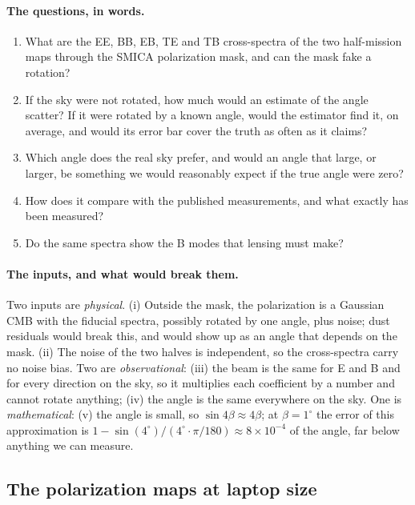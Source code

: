 \paragraph{The questions, in words.}
\begin{enumerate}[label=(\alph*),itemsep=2pt,leftmargin=2em]
  \item What are the EE, BB, EB, TE and TB cross-spectra of the two half-mission maps through the SMICA
        polarization mask, and can the mask fake a rotation?
  \item If the sky were not rotated, how much would an estimate of the angle scatter? If it were rotated
        by a known angle, would the estimator find it, on average, and would its error bar cover the truth
        as often as it claims?
  \item Which angle does the real sky prefer, and would an angle that large, or larger, be something we
        would reasonably expect if the true angle were zero?
  \item How does it compare with the published measurements, and what exactly has been measured?
  \item Do the same spectra show the B modes that lensing must make?
\end{enumerate}

\paragraph{The inputs, and what would break them.} Two inputs are \emph{physical}. (i) Outside the mask,
the polarization is a Gaussian CMB with the fiducial spectra, possibly rotated by one angle, plus noise;
dust residuals would break this, and would show up as an angle that depends on the mask. (ii) The noise
of the two halves is independent, so the cross-spectra carry no noise bias. Two are \emph{observational}:
(iii) the beam is the same for E and B and for every direction on the sky, so it multiplies each
coefficient by a number and cannot rotate anything; (iv) the angle is the same everywhere on the sky. One
is \emph{mathematical}: (v) the angle is small, so $\sin4\beta\approx4\beta$; at $\beta=1^\circ$ the
error of this approximation is $1-\sin(4^\circ)/(4^\circ\cdot\pi/180)\approx8\times10^{-4}$ of the
angle, far below anything we can measure.

\subsection{The polarization maps at laptop size}
\label{13e:sec:files}


